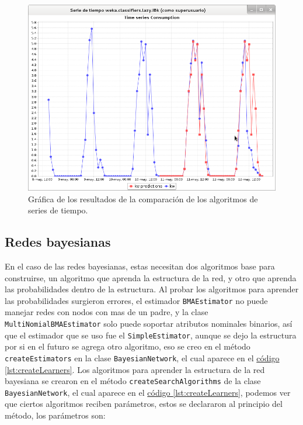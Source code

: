 \begin{figure}[ht]
	\centering
	\includegraphics[width=15cm]{img/graficaResultadosCompSeries.png}
	\caption{Gráfica de los resultados de la comparación de los algoritmos de series de tiempo.}
	\label{fig:graficaResultadosCompSeries}
\end{figure}

\subsection{Redes bayesianas} \label{subsec:compRedes}
En el caso de las redes bayesianas, estas necesitan dos algoritmos base para construirse, un algoritmo que aprenda la estructura de la red, y otro que aprenda las probabilidades dentro de la estructura. Al probar los algoritmos para aprender las probabilidades surgieron errores, el estimador \texttt{BMAEstimator} no puede manejar redes con nodos con mas de un padre, y la clase \texttt{MultiNomialBMAEstimator} solo puede soportar atributos nominales binarios, así que el estimador que se uso fue el \texttt{SimpleEstimator}, aunque se dejo la estructura por si en el futuro se agrega otro algoritmo, eso se creo en el método \texttt{createEstimators} en la clase \texttt{BayesianNetwork}, el cual aparece en el 
\hyperref[lst:createLearners]{código \ref{lst:createLearners}}.
Los algoritmos para aprender la estructura de la red bayesiana se crearon en el método \texttt{createSearchAlgorithms} de la clase \texttt{BayesianNetwork}, el cual aparece en el 
\hyperref[lst:createLearners]{código \ref{lst:createLearners}}, podemos ver que ciertos algoritmos reciben parámetros, estos se declararon al principio del método, los parámetros son: 

